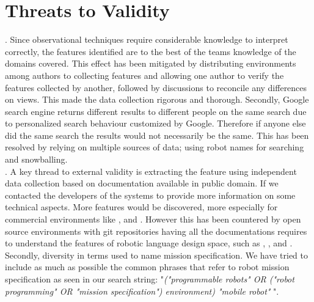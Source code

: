 \section{Threats to Validity}
. Since observational techniques require considerable knowledge to interpret correctly, the features identified are to the best of the teams knowledge of the domains covered. This effect has been mitigated by distributing environments among authors to collecting features and allowing one author to verify the features collected by another, followed by discussions to reconcile any differences on views. This made the data collection rigorous and thorough. Secondly, Google search engine returns different results to different people on the same search due to personalized search behaviour customized by Google. Therefore if anyone else did the same search the results would not necessarily be the same. This has been resolved by relying on multiple sources of data; using robot names for searching and snowballing.\\
. A key thread to external validity is extracting the feature using independent data collection based on documentation available in public domain. If we contacted the developers of the systems to provide more information on some technical aspects. More features would be discovered, more especially for commercial environments like \picaxe, \edison and \blocklyprop. However this has been countered by open source environments with git repositories having all the documentations requires to understand the features of robotic language design space, such as \openroberta, \trik, and \aseba. 
Secondly, diversity in terms used to name mission specification. We have tried to include as much as possible the common phrases that refer to robot mission specification as seen in our search string: "\emph{("programmable robots" OR ("robot programming" OR "mission specification") environment) "mobile robot"} ".\\
